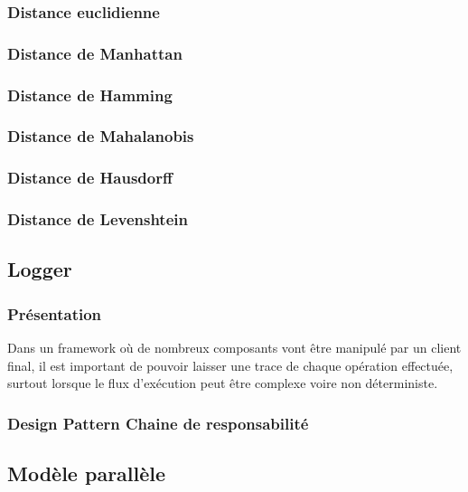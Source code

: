 \subsubsection{Distance euclidienne}
\subsubsection{Distance de Manhattan}
\subsubsection{Distance de Hamming}
\subsubsection{Distance de Mahalanobis}
\subsubsection{Distance de Hausdorff}
\subsubsection{Distance de Levenshtein}

\subsection{Logger}
\subsubsection{Présentation}
Dans un framework où de nombreux composants vont être manipulé par un client final, il est important de pouvoir laisser une trace de chaque opération effectuée, surtout lorsque le flux d'exécution peut être complexe voire non déterministe.
\subsubsection{Design Pattern Chaine de responsabilité}

\subsection{Modèle parallèle}
